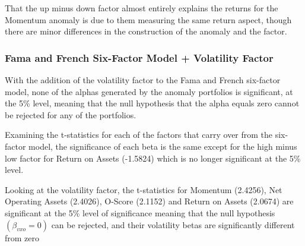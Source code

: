 \documentclass[a4paper]{article}                 %
\begin{document}
That the up minus down factor almost entirely explains the returns for the Momentum anomaly is due to them measuring the same return aspect, though there are minor differences in the construction of the anomaly and the factor.

\subsubsection{Fama and French Six-Factor Model + Volatility Factor}
With the addition of the volatility factor to the Fama and French six-factor model, none of the alphas generated by the anomaly portfolios is significant, at the 5\% level, meaning that the null hypothesis that the alpha equals zero cannot be rejected for any of the portfolios. 

Examining the t-statistics for each of the factors that carry over from the six-factor model, the significance of each beta is the same except for the high minus low factor for Return on Assets (-1.5824) which is no longer significant at the 5\% level. 

Looking at the volatility factor, the t-statistics for Momentum (2.4256), Net Operating Assets (2.4026), O-Score (2.1152) and Return on Assets (2.0674) are significant at the 5\% level of significance meaning that the null hypothesis $(\beta_{vxo}= 0)$ can be rejected, and their volatility betas are significantly different from zero
\end{document}
